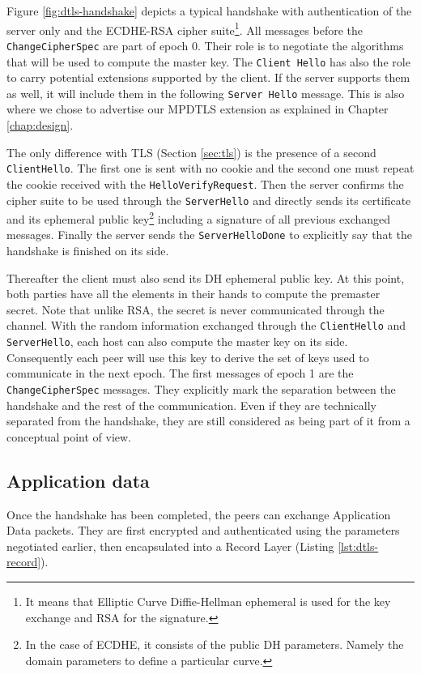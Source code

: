 Figure \ref{fig:dtls-handshake} depicts a typical handshake with authentication of the server only and the ECDHE-RSA cipher suite\footnote{It means that Elliptic Curve Diffie-Hellman ephemeral is used for the key exchange and RSA for the signature.}. All messages before the \texttt{ChangeCipherSpec} are part of epoch 0. Their role is to negotiate the algorithms that will be used to compute the master key. The \texttt{Client Hello} has also the role to carry potential extensions supported by the client. If the server supports them as well, it will include them in the following \texttt{Server Hello} message. This is also where we chose to advertise our MPDTLS extension as explained in Chapter \ref{chap:design}.

The only difference with TLS (Section \ref{sec:tls}) is the presence of a second \texttt{ClientHello}. The first one is sent with no cookie and the second one must repeat the cookie received with the \texttt{HelloVerifyRequest}. Then the server confirms the cipher suite to be used through the \texttt{ServerHello} and directly sends its certificate and its ephemeral public key\footnote{In the case of ECDHE, it consists of the public DH parameters. Namely the domain parameters to define a particular curve.} including a signature of all previous exchanged messages. Finally the server sends the \texttt{ServerHelloDone} to explicitly say that the handshake is finished on its side.

Thereafter the client must also send its DH ephemeral public key. At this point, both parties have all the elements in their hands to compute the premaster secret. Note that unlike RSA, the secret is never communicated through the channel. With the random information exchanged through the \texttt{ClientHello} and \texttt{ServerHello}, each host can also compute the master key on its side. Consequently each peer will use this key to derive the set of keys used to communicate in the next epoch. The first messages of epoch 1 are the \texttt{ChangeCipherSpec} messages. They explicitly mark the separation between the handshake and the rest of the communication. Even if they are technically separated from the handshake, they are still considered as being part of it from a conceptual point of view.


\subsection{Application data}

Once the handshake has been completed, the peers can exchange Application Data packets. They are first encrypted and authenticated using the parameters negotiated earlier, then encapsulated into a Record Layer (Listing \ref{lst:dtls-record}).


